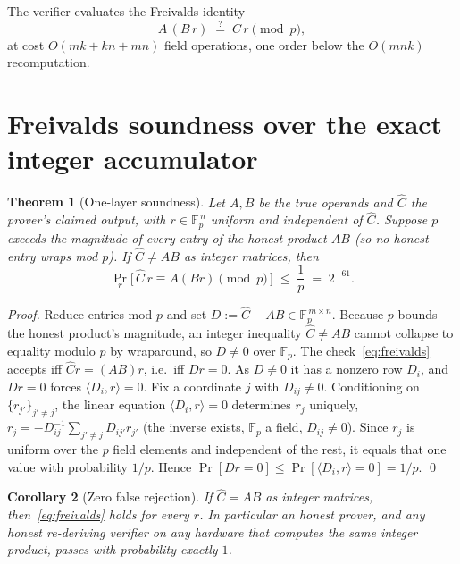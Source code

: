 \documentclass[11pt]{article}
\newtheorem{theorem}{Theorem}
\newtheorem{corollary}[theorem]{Corollary}
\newcommand{\F}{\mathbb{F}}
\begin{document}
The verifier evaluates the Freivalds identity
\begin{equation}
\label{eq:freivalds}
A\,(B\,r) \;\overset{?}{=}\; C\,r \pmod p,
\end{equation}
at cost $O(mk + kn + mn)$ field operations, one order below the $O(mnk)$ recomputation.

\section{Freivalds soundness over the exact integer accumulator}

\begin{theorem}[One-layer soundness]
\label{thm:one-layer}
Let $A,B$ be the true operands and $\hat C$ the prover's claimed output, with $r \in
\F_p^{\,n}$ uniform and independent of $\hat C$. Suppose $p$ exceeds the magnitude of every
entry of the honest product $AB$ \textup{(}so no honest entry wraps mod $p$\textup{)}. If
$\hat C \ne AB$ as integer matrices, then
\[
\Pr_r\bigl[\,\hat C\, r \equiv A(Br) \pmod p\,\bigr] \;\le\; \frac1p \;=\; 2^{-61}.
\]
\end{theorem}

\begin{proof}
Reduce entries mod $p$ and set $D := \hat C - AB \in \F_p^{\,m\times n}$. Because $p$ bounds
the honest product's magnitude, an integer inequality $\hat C \ne AB$ cannot collapse to
equality modulo $p$ by wraparound, so $D \ne 0$ over $\F_p$. The check~\eqref{eq:freivalds}
accepts iff $\hat C r = (AB) r$, i.e.\ iff $Dr = 0$. As $D \ne 0$ it has a nonzero row
$D_i$, and $Dr = 0$ forces $\langle D_i, r\rangle = 0$. Fix a coordinate $j$ with $D_{ij}
\ne 0$. Conditioning on $\{r_{j'}\}_{j'\ne j}$, the linear equation $\langle D_i, r\rangle =
0$ determines $r_j$ uniquely, $r_j = -D_{ij}^{-1}\sum_{j'\ne j} D_{ij'} r_{j'}$ (the inverse
exists, $\F_p$ a field, $D_{ij}\ne0$). Since $r_j$ is uniform over the $p$ field elements and
independent of the rest, it equals that one value with probability $1/p$. Hence $\Pr[Dr = 0]
\le \Pr[\langle D_i, r\rangle = 0] = 1/p$. \qed
\end{proof}

\begin{corollary}[Zero false rejection]
\label{cor:zero-fr}
If $\hat C = AB$ as integer matrices, then~\eqref{eq:freivalds} holds for \emph{every} $r$.
In particular an honest prover, and any honest re-deriving verifier on any hardware that
computes the same integer product, passes with probability exactly $1$.
\end{corollary}
\end{document}

